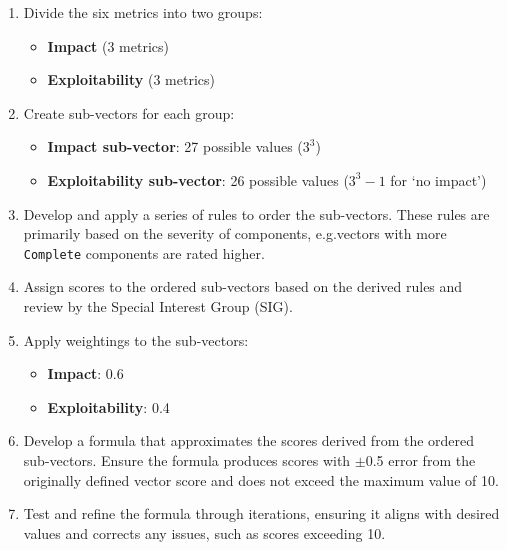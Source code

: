 \documentclass[12pt]{article}
\begin{document}
\begin{enumerate}
	\item  Divide the six metrics into two groups:

	      \begin{itemize}
		      \item \textbf{Impact} (3 metrics)
		      \item \textbf{Exploitability} (3 metrics)
	      \end{itemize}

	\item Create sub-vectors for each group:
	      \begin{itemize}
		      \item \textbf{Impact sub-vector}: 27 possible values ($3^3$)
		      \item \textbf{Exploitability sub-vector}: 26 possible values ($3^3 - 1$ for `no impact')
	      \end{itemize}

	\item Develop and apply a series of rules to order the sub-vectors. These rules
	      are primarily based on the severity of components, e.g.\@ vectors with more
	      \texttt{Complete}
	      components are rated higher.

	\item Assign scores to the ordered sub-vectors based on the derived rules and review by the
	      Special Interest Group (SIG).

	\item Apply weightings to the sub-vectors:
	      \begin{itemize}
		      \item \textbf{Impact}: 0.6
		      \item \textbf{Exploitability}: 0.4
	      \end{itemize}

	\item \label{formula_description} Develop a formula that approximates the scores derived from the ordered
	      sub-vectors. Ensure the formula produces scores with $\pm$0.5 error from the originally
	      defined vector score and does not exceed the maximum value of 10.

	\item Test and refine the formula through iterations, ensuring it aligns with desired values and
	      corrects any issues, such as scores exceeding 10.

\end{enumerate}
\end{document}
